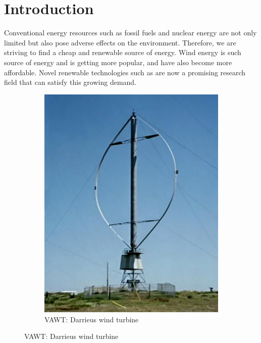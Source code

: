 \chapter{Introduction}
\label{ch:Introduction}
Conventional energy resources such as fossil fuels and nuclear energy are not only limited but also pose adverse effects on the environment. Therefore, we are striving to find a cheap and renewable source of energy. Wind energy is such source of energy and is getting more popular, and have also become more affordable. Novel renewable technologies such as  are now a promising research field that can satisfy this growing demand.

	\begin{figure}[!b]
        \centering
        \begin{subfigure}[b]{0.25\textwidth}
                \includegraphics[height=0.2\textheight]{figures/introduction/Darrieus-windmill.jpg}
                \caption{VAWT: Darrieus wind turbine\cite{darrieusWindmill}}
                \label{fig:Darrieus-windmill}
        \end{subfigure}%
        \qquad \qquad%

\end{figure}
